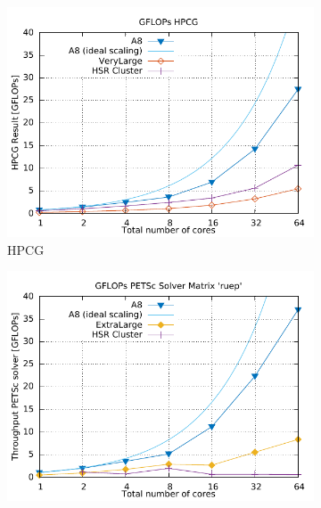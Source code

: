 \documentclass[3p,times]{elsarticle}
\begin{document}
\begin{figure}[h]
\centering
\begin{subfigure}{.33\textwidth}
	\centering
	\includegraphics[width=\linewidth]{gplt-gflops-hpcg}
	\caption{HPCG}

	\label{fig:hpcg}
\end{subfigure}
\begin{subfigure}{.33\textwidth}
  \centering
	\includegraphics[width=\linewidth]{gplt-gflops-ruep}  


\end{subfigure}
\end{figure}
\end{document}
